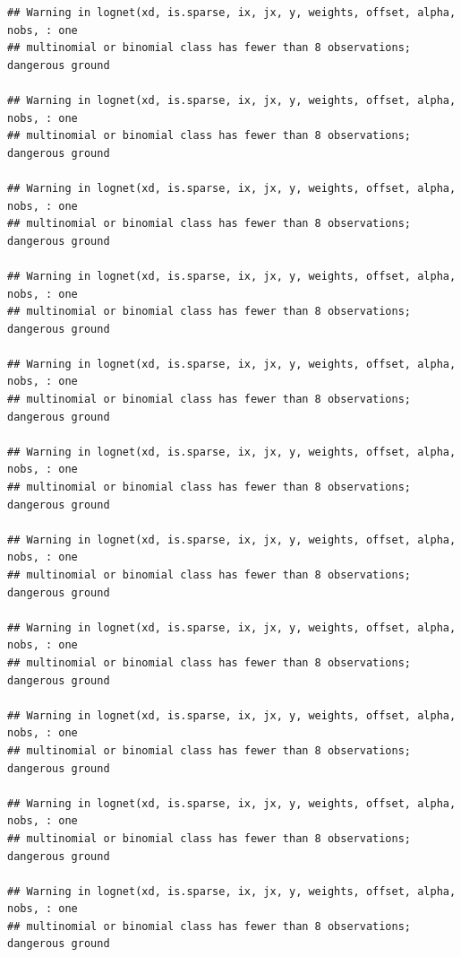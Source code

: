 \documentclass[
]{book}
\newenvironment{Shaded}{\begin{snugshade}}{\end{snugshade}}
\newcommand{\AttributeTok}[1]{\textcolor[rgb]{0.77,0.63,0.00}{#1}}
\newcommand{\FunctionTok}[1]{\textcolor[rgb]{0.00,0.00,0.00}{#1}}
\newcommand{\NormalTok}[1]{#1}
\newcommand{\OtherTok}[1]{\textcolor[rgb]{0.56,0.35,0.01}{#1}}
\newcommand{\SpecialCharTok}[1]{\textcolor[rgb]{0.00,0.00,0.00}{#1}}
\newcommand{\StringTok}[1]{\textcolor[rgb]{0.31,0.60,0.02}{#1}}
\begin{document}
\begin{verbatim}
## Warning in lognet(xd, is.sparse, ix, jx, y, weights, offset, alpha, nobs, : one
## multinomial or binomial class has fewer than 8 observations; dangerous ground

## Warning in lognet(xd, is.sparse, ix, jx, y, weights, offset, alpha, nobs, : one
## multinomial or binomial class has fewer than 8 observations; dangerous ground

## Warning in lognet(xd, is.sparse, ix, jx, y, weights, offset, alpha, nobs, : one
## multinomial or binomial class has fewer than 8 observations; dangerous ground

## Warning in lognet(xd, is.sparse, ix, jx, y, weights, offset, alpha, nobs, : one
## multinomial or binomial class has fewer than 8 observations; dangerous ground

## Warning in lognet(xd, is.sparse, ix, jx, y, weights, offset, alpha, nobs, : one
## multinomial or binomial class has fewer than 8 observations; dangerous ground

## Warning in lognet(xd, is.sparse, ix, jx, y, weights, offset, alpha, nobs, : one
## multinomial or binomial class has fewer than 8 observations; dangerous ground

## Warning in lognet(xd, is.sparse, ix, jx, y, weights, offset, alpha, nobs, : one
## multinomial or binomial class has fewer than 8 observations; dangerous ground

## Warning in lognet(xd, is.sparse, ix, jx, y, weights, offset, alpha, nobs, : one
## multinomial or binomial class has fewer than 8 observations; dangerous ground

## Warning in lognet(xd, is.sparse, ix, jx, y, weights, offset, alpha, nobs, : one
## multinomial or binomial class has fewer than 8 observations; dangerous ground

## Warning in lognet(xd, is.sparse, ix, jx, y, weights, offset, alpha, nobs, : one
## multinomial or binomial class has fewer than 8 observations; dangerous ground

## Warning in lognet(xd, is.sparse, ix, jx, y, weights, offset, alpha, nobs, : one
## multinomial or binomial class has fewer than 8 observations; dangerous ground
\end{verbatim}

\begin{Shaded}
\end{Shaded}
\end{document}
